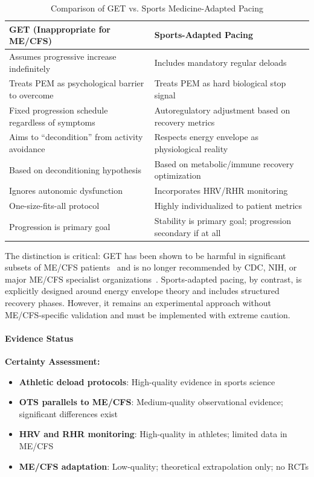 \begin{table}[h]
\centering
\begin{tabular}{>{\raggedright\arraybackslash}p{} >{\raggedright\arraybackslash}p{}}
\toprule
\textbf{GET (Inappropriate for ME/CFS)} & \textbf{Sports-Adapted Pacing} \\
\midrule
Assumes progressive increase indefinitely & Includes mandatory regular deloads \\
Treats PEM as psychological barrier to overcome & Treats PEM as hard biological stop signal \\
Fixed progression schedule regardless of symptoms & Autoregulatory adjustment based on recovery metrics \\
Aims to ``decondition'' from activity avoidance & Respects energy envelope as physiological reality \\
Based on deconditioning hypothesis & Based on metabolic/immune recovery optimization \\
Ignores autonomic dysfunction & Incorporates HRV/RHR monitoring \\
One-size-fits-all protocol & Highly individualized to patient metrics \\
Progression is primary goal & Stability is primary goal; progression secondary if at all \\
\bottomrule
\end{tabular}
\caption{Comparison of GET vs. Sports Medicine-Adapted Pacing}
\label{tab:get-vs-sports-pacing}
\end{table}

The distinction is critical: GET has been shown to be harmful in significant subsets of ME/CFS patients~\cite{EatonFitch2019,Wilshire2018} and is no longer recommended by CDC, NIH, or major ME/CFS specialist organizations~\cite{NICE2021mecfs}. Sports-adapted pacing, by contrast, is explicitly designed around energy envelope theory and includes structured recovery phases. However, it remains an experimental approach without ME/CFS-specific validation and must be implemented with extreme caution.

\paragraph{Evidence Status}

\textbf{Certainty Assessment:}
\begin{itemize}
    \item \textbf{Athletic deload protocols}: High-quality evidence in sports science
    \item \textbf{OTS parallels to ME/CFS}: Medium-quality observational evidence; significant differences exist
    \item \textbf{HRV and RHR monitoring}: High-quality in athletes; limited data in ME/CFS
    \item \textbf{ME/CFS adaptation}: Low-quality; theoretical extrapolation only; no RCTs
\end{itemize}

